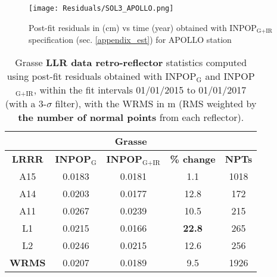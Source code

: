 \documentclass[fleqn,usenatbib,referee]{mnras}
\begin{document}
    \begin{figure}
    \centering
    \texttt{[image: Residuals/SOL3\_APOLLO.png]}
    \caption{Post-fit residuals in (cm) vs time (year) obtained with INPOP$_{\textrm{G+IR}}$ specification (sec. \ref{appendix_est}) for APOLLO station}
    \label{fig:pf_Apollo}
    \end{figure}

\begin{table*}
    \caption{Grasse \textbf{LLR data retro-reflector} statistics computed using post-fit residuals obtained with INPOP$_{\textrm{G}}$ and INPOP$_{\textrm{G+IR}}$, within the fit intervals 01/01/2015 to 01/01/2017 (with a 3-$\sigma$ filter), with the WRMS in m (RMS weighted by \textbf{the number of normal points} from each reflector). }
    \label{A15_bias_stats_1}
    \begin{tabular}{|c|cccc }
    \hline 
    \multicolumn{5}{c|}{\textbf{Grasse} }                                \\ \hline
    \textbf{LRRR}     & \textbf{INPOP$_{\textrm{G}}$}   & \textbf{INPOP$_{\textrm{G+IR}}$}   & \textbf{\% change}   & \textbf{NPTs}    \\ \hline
    A15               & 0.0183                & 0.0181                & 1.1     & 1018          \\  
    A14               & 0.0203                & 0.0177                & 12.8     &172          \\
    A11               & 0.0267                & 0.0239                & 10.5     &215           \\ 
    L1                & 0.0215                & 0.0166         &\textbf{22.8}    &265              \\ 
    L2                & 0.0246                & 0.0215                & 12.6     & 256          \\ \hline
    \textbf{WRMS}     & 0.0207    & 0.0189        & 9.5  & 1926        \\ \hline   
    \end{tabular}
    \end{table*}
\end{document}
